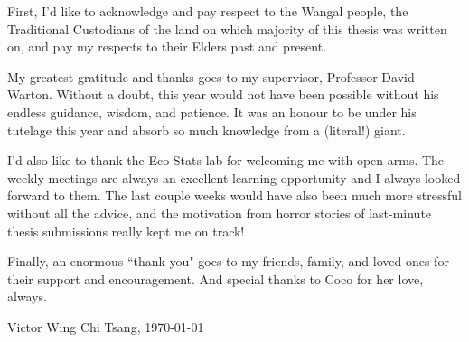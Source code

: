 
{\bigskip} First, I'd like to acknowledge and pay respect to the Wangal people, the Traditional Custodians of the land on which majority of this thesis was written on, and pay my respects to their Elders past and present.

{\bigskip} My greatest gratitude and thanks goes to my supervisor, Professor David Warton. Without a doubt, this year would not have been possible without his endless guidance, wisdom, and patience. It was an honour to be under his tutelage this year and absorb so much knowledge from a (literal!) giant.

{\bigskip} I'd also like to thank the Eco-Stats lab for welcoming me with open arms. The weekly meetings are always an excellent learning opportunity and I always looked forward to them. The last couple weeks would have also been much more stressful without all the advice, and the motivation from horror stories of last-minute thesis submissions really kept me on track!

{\bigskip} Finally, an enormous ``thank you" goes to my friends, family, and loved ones for their support and encouragement. And special thanks to Coco for her love, always.

{\bigskip\bigskip\bigskip}Victor Wing Chi Tsang, \today
